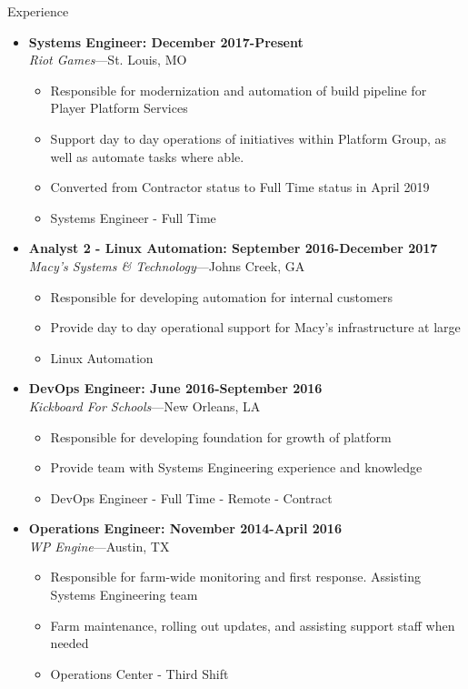 \documentclass[10pt,oneside]{article}
\newenvironment{ressection}[1]{
    \vspace{4pt}
    {\fontfamily{phv}\selectfont\Large#1}
    \begin{itemize}
    \vspace{3pt}
}{
    \end{itemize}
}
\newcommand{\resitem}[1]{
    \vspace{-4pt}
    \item \begin{flushleft} #1 \end{flushleft}
}
\newcommand{\ressubitem}[1]{
    \vspace{-1pt}
    \item \begin{flushleft} #1 \end{flushleft}
}
\newcommand{\resbigitem}[3]{
    \vspace{-5pt}
    \item
    \textbf{#3} \\
    \textit{#1}---#2
}
\newenvironment{ressubsec}[3]{
    \resbigitem{#1}{#2}{#3}
    \vspace{-2pt}
    \begin{itemize}
}{
    \end{itemize}
}
\newenvironment{reslist}[1]{
    \resitem{\textbf{#1}}
    \vspace{-5pt}
    \begin{itemize}
}{
    \end{itemize}
}
\begin{document}
\begin{ressection}{Experience}

    \begin{ressubsec}{Riot Games}{St. Louis, MO}{Systems Engineer: December 2017-Present}
        \ressubitem{Responsible for modernization and automation of build pipeline for Player Platform Services}
        \ressubitem{Support day to day operations of initiatives within Platform Group, as well as automate tasks where able.}
        \ressubitem{Converted from Contractor status to Full Time status in April 2019}
        \ressubitem{Systems Engineer - Full Time}
    \end{ressubsec}

    \begin{ressubsec}{Macy's Systems \& Technology}{Johns Creek, GA}{Analyst 2 - Linux Automation: September 2016-December 2017}
        \ressubitem{Responsible for developing automation for internal customers}
        \ressubitem{Provide day to day operational support for Macy's infrastructure at large}
        \ressubitem{Linux Automation}
    \end{ressubsec}

    \begin{ressubsec}{Kickboard For Schools}{New Orleans, LA}{DevOps Engineer: June 2016-September 2016}
        \ressubitem{Responsible for developing foundation for growth of platform}
        \ressubitem{Provide team with Systems Engineering experience and knowledge}
        \ressubitem{DevOps Engineer - Full Time - Remote - Contract}
    \end{ressubsec}

    \begin{ressubsec}{WP Engine}{Austin, TX}{Operations Engineer: November 2014-April 2016}
        \ressubitem{Responsible for farm-wide monitoring and first response.  Assisting Systems Engineering team}
        \ressubitem{Farm maintenance, rolling out updates, and assisting support staff when needed}
        \ressubitem{Operations Center - Third Shift}
    \end{ressubsec}


\end{ressection}
\end{document}
